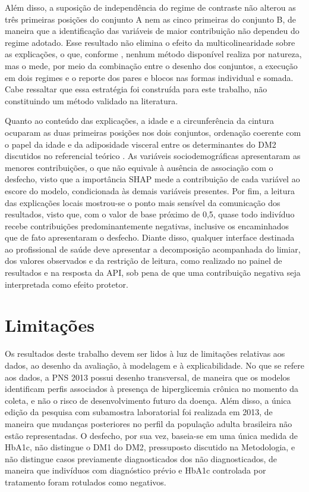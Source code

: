 Além disso, a suposição de independência do regime de contraste não alterou as três primeiras posições do conjunto A nem as cinco primeiras do conjunto B, de maneira que a identificação das variáveis de maior contribuição não dependeu do regime adotado. Esse resultado não elimina o efeito da multicolinearidade sobre as explicações, o que, conforme \textcite{Salih2024}, nenhum método disponível realiza por natureza, mas o mede, por meio da combinação entre o desenho dos conjuntos, a execução em dois regimes e o reporte dos pares e blocos nas formas individual e somada. Cabe ressaltar que essa estratégia foi construída para este trabalho, não constituindo um método validado na literatura.

Quanto ao conteúdo das explicações, a idade e a circunferência da cintura ocuparam as duas primeiras posições nos dois conjuntos, ordenação coerente com o papel da idade e da adiposidade visceral entre os determinantes do DM2 discutidos no referencial teórico \cite{mlynarska2025type, Feller2010}. As variáveis sociodemográficas apresentaram as menores contribuições, o que não equivale à ausência de associação com o desfecho, visto que a importância SHAP mede a contribuição de cada variável ao escore do modelo, condicionada às demais variáveis presentes. Por fim, a leitura das explicações locais mostrou-se o ponto mais sensível da comunicação dos resultados, visto que, com o valor de base próximo de 0,5, quase todo indivíduo recebe contribuições predominantemente negativas, inclusive os encaminhados que de fato apresentaram o desfecho. Diante disso, qualquer interface destinada ao profissional de saúde deve apresentar a decomposição acompanhada do limiar, dos valores observados e da restrição de leitura, como realizado no painel de resultados e na resposta da API, sob pena de que uma contribuição negativa seja interpretada como efeito protetor.

\section{Limitações}\label{sec:limitacoes}
Os resultados deste trabalho devem ser lidos à luz de limitações relativas aos dados, ao desenho da avaliação, à modelagem e à explicabilidade. No que se refere aos dados, a PNS 2013 possui desenho transversal, de maneira que os modelos identificam perfis associados à presença de hiperglicemia crônica no momento da coleta, e não o risco de desenvolvimento futuro da doença. Além disso, a única edição da pesquisa com subamostra laboratorial foi realizada em 2013, de maneira que mudanças posteriores no perfil da população adulta brasileira não estão representadas. O desfecho, por sua vez, baseia-se em uma única medida de HbA1c, não distingue o DM1 do DM2, pressuposto discutido na Metodologia, e não distingue casos previamente diagnosticados dos não diagnosticados, de maneira que indivíduos com diagnóstico prévio e HbA1c controlada por tratamento foram rotulados como negativos.

